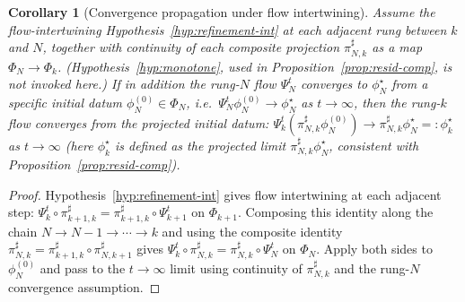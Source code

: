 \documentclass[11pt]{article}
\newtheorem{corollary}[theorem]{Corollary}
\theoremstyle{definition}
\begin{document}
\begin{corollary}[Convergence propagation under flow intertwining]\label{cor:conv-prop}
Assume the flow-intertwining Hypothesis~\ref{hyp:refinement-int} at
each adjacent rung between $k$ and $N$, together with continuity of
each composite projection $\pi^{\sharp}_{N, k}$ as a map
$\Phi_N \to \Phi_k$. (Hypothesis~\ref{hyp:monotone}, used in
Proposition~\ref{prop:resid-comp}, is not invoked here.) If in
addition the rung-$N$ flow $\Psi_N^t$ converges to $\phi^\star_N$
from a specific initial datum
$\phi_N^{(0)} \in \Phi_N$, i.e.\ $\Psi_N^t \phi_N^{(0)} \to
\phi^\star_N$ as $t \to \infty$, then the rung-$k$ flow converges
from the projected initial datum:
$\Psi_k^t (\pi^{\sharp}_{N, k} \phi_N^{(0)}) \to
\pi^{\sharp}_{N, k} \phi^\star_N =: \phi^\star_k$ as $t \to \infty$
(here $\phi^\star_k$ is defined as the projected limit
$\pi^{\sharp}_{N, k} \phi^\star_N$, consistent with
Proposition~\ref{prop:resid-comp}).
\end{corollary}
\begin{proof}
Hypothesis~\ref{hyp:refinement-int} gives flow intertwining at each
adjacent step: $\Psi_k^t \circ \pi^{\sharp}_{k+1, k} =
\pi^{\sharp}_{k+1, k} \circ \Psi_{k+1}^t$ on $\Phi_{k+1}$. Composing
this identity along the chain $N \to N-1 \to \cdots \to k$ and using
the composite identity
$\pi^{\sharp}_{N, k} = \pi^{\sharp}_{k+1, k} \circ \pi^{\sharp}_{N, k+1}$
gives $\Psi_k^t \circ \pi^{\sharp}_{N, k} = \pi^{\sharp}_{N, k} \circ
\Psi_N^t$ on $\Phi_N$. Apply both sides to $\phi_N^{(0)}$ and pass to
the $t \to \infty$ limit using continuity of $\pi^{\sharp}_{N, k}$
and the rung-$N$ convergence assumption.
\end{proof}
\end{document}
